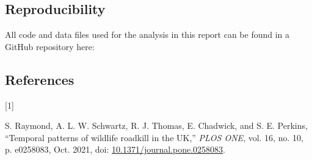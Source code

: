 \documentclass[
]{article}
\newlength{\cslhangindent}
\newlength{\csllabelwidth}
\newenvironment{CSLReferences}[2] %
 {\begin{list}{}{%
  \setlength{\itemindent}{0pt}
  \setlength{\leftmargin}{0pt}
  \setlength{\parsep}{0pt}
  \ifodd #1
   \setlength{\leftmargin}{\cslhangindent}
   \setlength{\itemindent}{-1\cslhangindent}
  \fi
  \setlength{\itemsep}{#2\baselineskip}}}
 {\end{list}}
\newcommand{\CSLLeftMargin}[1]{\parbox[t]{\csllabelwidth}{\strut#1\strut}}
\newcommand{\CSLRightInline}[1]{\parbox[t]{\linewidth - \csllabelwidth}{\strut#1\strut}}
\begin{document}
\subsection{Reproducibility}\label{reproducibility}

All code and data files used for the analysis in this report can be
found in a GitHub repository here:

\subsection*{References}\label{references}

\label{refs}
\begin{CSLReferences}{0}{0}
\CSLLeftMargin{{[}1{]} }%
\CSLRightInline{S. Raymond, A. L. W. Schwartz, R. J. Thomas, E.
Chadwick, and S. E. Perkins, {``Temporal patterns of wildlife roadkill
in the {UK},''} \emph{PLOS ONE}, vol. 16, no. 10, p. e0258083, Oct.
2021, doi:
\href{https://doi.org/10.1371/journal.pone.0258083}{10.1371/journal.pone.0258083}.}

\end{CSLReferences}
\end{document}
